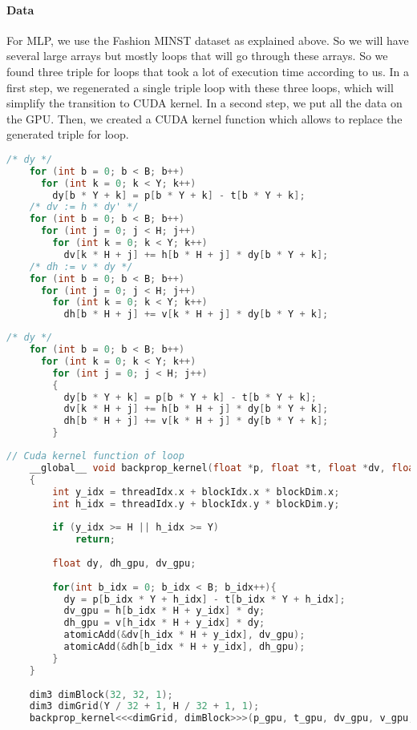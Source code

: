 \documentclass[11pt]{article}
\begin{document}
\paragraph*{Data} For MLP, we use the Fashion MINST dataset as explained above.
So we will have several large arrays but mostly loops that will go through these arrays.
So we found three triple for loops that took a lot of execution time according to us.
In a first step, we regenerated a single triple loop with these three loops, which will simplify the transition to CUDA kernel. In a second step, we put all the data on the GPU.
Then, we created a CUDA kernel function which allows to replace the generated triple for loop.


\begin{lstlisting}[language=C, caption="Original code with triple loop"]
	/* dy */
	for (int b = 0; b < B; b++)
	  for (int k = 0; k < Y; k++)
		dy[b * Y + k] = p[b * Y + k] - t[b * Y + k];
	/* dv := h * dy' */
	for (int b = 0; b < B; b++)
	  for (int j = 0; j < H; j++)
		for (int k = 0; k < Y; k++)
		  dv[k * H + j] += h[b * H + j] * dy[b * Y + k];
	/* dh := v * dy */
	for (int b = 0; b < B; b++)
	  for (int j = 0; j < H; j++)
		for (int k = 0; k < Y; k++)
		  dh[b * H + j] += v[k * H + j] * dy[b * Y + k];
\end{lstlisting}


\begin{lstlisting}[language=C, caption="Edited nested triple loop"]
	/* dy */
	for (int b = 0; b < B; b++)
	  for (int k = 0; k < Y; k++)
		for (int j = 0; j < H; j++)
		{
		  dy[b * Y + k] = p[b * Y + k] - t[b * Y + k];
		  dv[k * H + j] += h[b * H + j] * dy[b * Y + k];
		  dh[b * H + j] += v[k * H + j] * dy[b * Y + k];
		}
\end{lstlisting}

\begin{lstlisting}[language=C, caption="CUDA kernel function to calculate back\_propagation"]
	// Cuda kernel function of loop
	__global__ void backprop_kernel(float *p, float *t, float *dv, float *v, float *dh, float *h)
	{
		int y_idx = threadIdx.x + blockIdx.x * blockDim.x;
		int h_idx = threadIdx.y + blockIdx.y * blockDim.y;
	
		if (y_idx >= H || h_idx >= Y)
			return;
	
		float dy, dh_gpu, dv_gpu;
	
		for(int b_idx = 0; b_idx < B; b_idx++){
		  dy = p[b_idx * Y + h_idx] - t[b_idx * Y + h_idx];
		  dv_gpu = h[b_idx * H + y_idx] * dy;
		  dh_gpu = v[h_idx * H + y_idx] * dy;
		  atomicAdd(&dv[h_idx * H + y_idx], dv_gpu);
		  atomicAdd(&dh[b_idx * H + y_idx], dh_gpu);
		}
	}
	
	dim3 dimBlock(32, 32, 1);
	dim3 dimGrid(Y / 32 + 1, H / 32 + 1, 1);
	backprop_kernel<<<dimGrid, dimBlock>>>(p_gpu, t_gpu, dv_gpu, v_gpu, dh_gpu, h_gpu);
\end{lstlisting}
\end{document}
